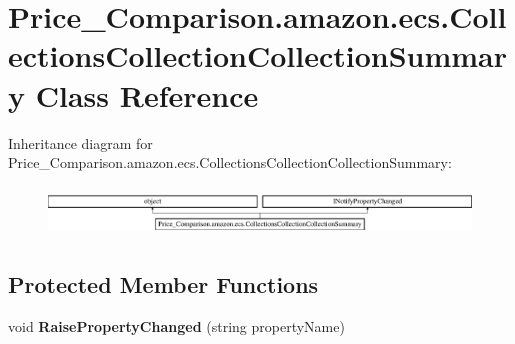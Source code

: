 \hypertarget{class_price___comparison_1_1amazon_1_1ecs_1_1_collections_collection_collection_summary}{\section{Price\-\_\-\-Comparison.\-amazon.\-ecs.\-Collections\-Collection\-Collection\-Summary Class Reference}
\label{class_price___comparison_1_1amazon_1_1ecs_1_1_collections_collection_collection_summary}
}


 


Inheritance diagram for Price\-\_\-\-Comparison.\-amazon.\-ecs.\-Collections\-Collection\-Collection\-Summary\-:\begin{figure}[H]
\begin{center}
\leavevmode
\includegraphics[height=1.317647cm]{class_price___comparison_1_1amazon_1_1ecs_1_1_collections_collection_collection_summary}
\end{center}
\end{figure}
\subsection*{Protected Member Functions}
\begin{DoxyCompactItemize}
\item 
\hypertarget{class_price___comparison_1_1amazon_1_1ecs_1_1_collections_collection_collection_summary_a5f4db6cdb3c0fec17ac87a03bb8381ff}{void {\bfseries Raise\-Property\-Changed} (string property\-Name)}\label{class_price___comparison_1_1amazon_1_1ecs_1_1_collections_collection_collection_summary_a5f4db6cdb3c0fec17ac87a03bb8381ff}

\end{DoxyCompactItemize}
